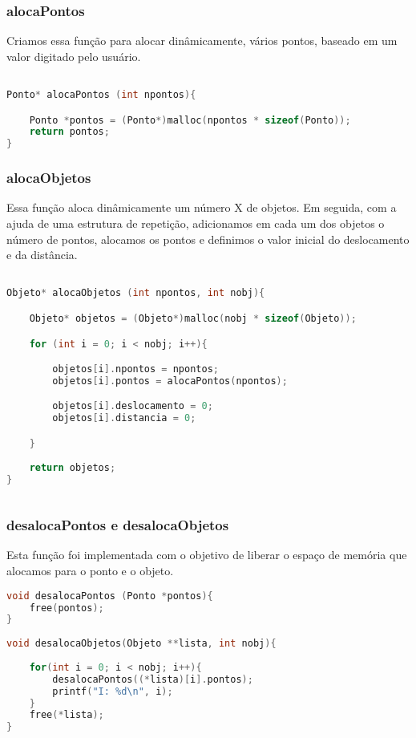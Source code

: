 \documentclass{article}
\begin{document}
\subsubsection{alocaPontos}

Criamos essa função para alocar dinâmicamente, vários pontos, baseado em um valor digitado pelo usuário.

\begin{lstlisting}[caption={Função alocaPontos},label={lst:cod2},language=C]

Ponto* alocaPontos (int npontos){

    Ponto *pontos = (Ponto*)malloc(npontos * sizeof(Ponto));
    return pontos;
}

\end{lstlisting}

\subsubsection{alocaObjetos}

Essa função aloca dinâmicamente um número X de objetos. Em seguida, com a ajuda de
uma estrutura de repetição, adicionamos em cada um dos objetos o número de pontos,
alocamos os pontos e definimos o valor inicial do deslocamento e da distância.

\begin{lstlisting}[caption={Função alocaObjetos},label={lst:cod3},language=C]

Objeto* alocaObjetos (int npontos, int nobj){

    Objeto* objetos = (Objeto*)malloc(nobj * sizeof(Objeto));

    for (int i = 0; i < nobj; i++){

        objetos[i].npontos = npontos;
        objetos[i].pontos = alocaPontos(npontos);

        objetos[i].deslocamento = 0;
        objetos[i].distancia = 0;

    }
    
    return objetos;
}
    
    \end{lstlisting}

\subsubsection{desalocaPontos e desalocaObjetos}
Esta função foi implementada com o objetivo de liberar o espaço de memória que alocamos para o ponto e o objeto.

\begin{lstlisting}[caption={Funções desalocaPontos e desalocaObjetos},label={lst:cod4},language=C]
void desalocaPontos (Ponto *pontos){
    free(pontos);
}
    
void desalocaObjetos(Objeto **lista, int nobj){
    
    for(int i = 0; i < nobj; i++){
        desalocaPontos((*lista)[i].pontos);
        printf("I: %d\n", i);
    }
    free(*lista);
}

\end{lstlisting}
\end{document}
